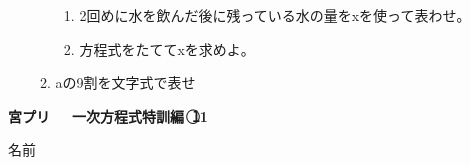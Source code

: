 \documentclass[a4paper,fleqn,papersize,15pt]{jsarticle}
\begin{document}
\begin{itemize}
\begin{enumerate}
\begin{enumerate}
\item 2回めに水を飲んだ後に残っている水の量をxを使って表わせ。 \vfill \begin{flushright}\framebox[8em]{\rule{0pt}{6ex}}\end{flushright} %
\item 方程式をたててxを求めよ。 \vfill \begin{flushright}\framebox[8em]{\rule{0pt}{6ex}}\end{flushright} %
\end{enumerate}
\item aの9割を文字式で表せ \vfill \begin{flushright}\framebox[8em]{\rule{0pt}{6ex}}\end{flushright} %
\end{enumerate}
    \vfill
\end{itemize}
\clearpage
 \begin{center}
   \LARGE\textbf{宮プリ　~一次方程式特訓編~\textcircled{\scriptsize 11}}
     \begin{flushright}
       名前\underline{\hspace{8zw}}
     \end{flushright}
 \end{center}
\end{document}
